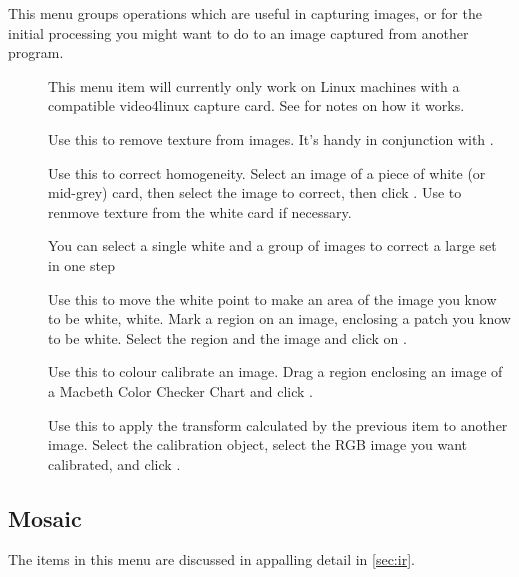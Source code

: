 This menu groups operations which are useful in capturing images, or for the
initial processing you might want to do to an image captured from another
program.

\begin{description}

\item[]
	This menu item will currently only work on Linux machines with a
	compatible video4linux capture card. See 
	for notes on how it works.

\item[]
	Use this to remove texture from images. It's handy in conjunction with
	.

\item[]
	Use this to correct homogeneity. Select an image of a piece of white
	(or mid-grey) card, then select the image to correct, then click
	. Use  to renmove texture from the white card
	if necessary.

	You can select a single white and a group of images to correct a large
	set in one step

\item[]
	Use this to move the white point to make an area of the image you know
	to be white, white.
	Mark a region on an image, enclosing a patch you know to be white.
	Select the region and the image and click on .

\item[]
	Use this to colour calibrate an image. Drag a region enclosing an
	image of a Macbeth Color Checker Chart and click . 

\item[]
	Use this to apply the transform calculated by the previous item to
	another image. Select the calibration object, select the RGB image
	you want calibrated, and click .

\end{description}

\subsection{Mosaic}

The items in this menu are discussed in appalling detail in
\cref{sec:ir}.


